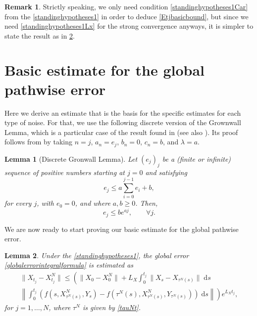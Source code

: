 \documentclass[reqno,12pt]{amsart}
\theoremstyle{plain} %
\newtheorem{lemma}{Lemma}[section]
\theoremstyle{definition} %
\newtheorem{remark}{Remark}[section]
\begin{document}
\begin{remark}
    Strictly speaking, we only need condition \eqref{standinghypotheses1Car} from the \cref{standinghypotheses1} in order to deduce \eqref{Etjbasicbound}, but since we need \eqref{standinghypotheses1Lx} for the strong convergence anyways, it is simpler to state the result as in \cref{lembasicestimate}.
\end{remark}

\section{Basic estimate for the global pathwise error}

Here we derive an estimate that is the basis for the specific estimates for each type of noise. For that, we use the following discrete version of the Grownwall Lemma, which is a particular case of the result found in \cite{GiraultRaviart1981} (see also \cite{Clark1987}). Its proof follows from \cite[Lemma V.2.4]{GiraultRaviart1981} by taking $n = j$, $a_n = e_j$, $b_n = 0$, $c_n = b$, and $\lambda = a$.

\begin{lemma}[Discrete Gronwall Lemma]
    \label{lemdiscretegronwall}
    Let $(e_j)_j$ be a (finite or infinite) sequence of positive numbers starting at $j=0$ and satisfying
    \begin{equation}
        \label{integralgronwall}
        e_j \leq a \sum_{i=0}^{j-1} e_i + b,
    \end{equation}
    for every $j$, with $e_0 = 0$, and where $a, b \geq 0$. Then,
    \begin{equation}
        \label{estimateintegralgronwall}
        e_j \leq b e^{aj}, \qquad \forall j.
    \end{equation}
\end{lemma}

We are now ready to start proving our basic estimate for the global pathwise error.
\begin{lemma}
    \label{lembasicestimate}
    Under the \cref{standinghypotheses1}, the global error \eqref{globalerrorintegralformula} is estimated as
    \begin{multline}
        \label{Etjbasicbound}
            \|X_{t_j} - X_{t_j}^N\| \leq \left( \|X_0 - X_0^N\| + L_X \int_0^{t_j} \|X_s - X_{\tau^N(s)}\| \;\mathrm{d}s \right. \\
            \left. \left\|\int_0^{t_j} \left( f(s, X_{\tau^N(s)}^N, Y_s) - f(\tau^N(s), X_{\tau^N(s)}^N, Y_{\tau^N(s)}) \right)\;\mathrm{d}s\right\|\right) e^{L_X t_j},
    \end{multline}
    for $j=1, \ldots, N$, where $\tau^N$ is given by \eqref{tauNt}.
\end{lemma}
\end{document}
